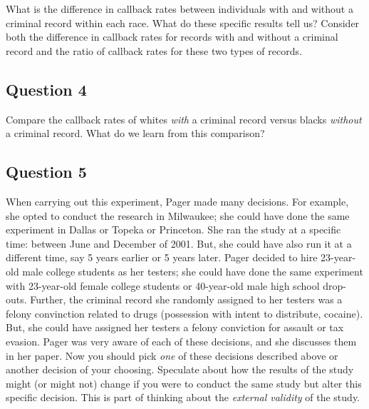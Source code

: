 \documentclass[]{article}
\begin{document}
What is the difference in callback rates between individuals with and
without a criminal record within each race. What do these specific
results tell us? Consider both the difference in callback rates for
records with and without a criminal record and the ratio of callback
rates for these two types of records.

\subsection{Question 4}\label{question-4}

Compare the callback rates of whites \emph{with} a criminal record
versus blacks \emph{without} a criminal record. What do we learn from
this comparison?

\subsection{Question 5}\label{question-5}

When carrying out this experiment, Pager made many decisions. For
example, she opted to conduct the research in Milwaukee; she could have
done the same experiment in Dallas or Topeka or Princeton. She ran the
study at a specific time: between June and December of 2001. But, she
could have also run it at a different time, say 5 years earlier or 5
years later. Pager decided to hire 23-year-old male college students as
her testers; she could have done the same experiment with 23-year-old
female college students or 40-year-old male high school drop-outs.
Further, the criminal record she randomly assigned to her testers was a
felony convinction related to drugs (possession with intent to
distribute, cocaine). But, she could have assigned her testers a felony
conviction for assault or tax evasion. Pager was very aware of each of
these decisions, and she discusses them in her paper. Now you should
pick \emph{one} of these decisions described above or another decision
of your choosing. Speculate about how the results of the study might (or
might not) change if you were to conduct the same study but alter this
specific decision. This is part of thinking about the \emph{external
validity} of the study.
\end{document}
